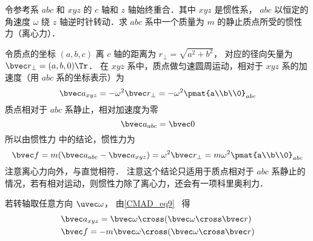 
令参考系 $abc$ 和 $xyz$ 的 $c$ 轴和 $z$ 轴始终重合．其中 $xyz$ 是惯性系， $abc$ 以恒定的角速度 $\omega$ 绕 $z$ 轴逆时针转动．求 $abc$ 系中一个质量为 $m$ 的静止质点所受的惯性力（离心力）．

令质点的坐标 $(a,b,c)$ 离 $c$ 轴的距离为 $r_\bot = \sqrt{a^2 + b^2}$， 对应的径向矢量为 $\bvec r_\bot = (a,b,0)\Tr$． 在 $xyz$ 系中，质点做匀速圆周运动，相对于 $xyz$ 系的加速度（用 $abc$ 系的坐标表示）为
\begin{equation}
\bvec a_{xyz} =  - \omega ^2 \bvec r_\bot =  - \omega ^2 \pmat{a\\b\\0}_{abc}
\end{equation}
质点相对于 $abc$ 系静止，相对加速度为零
\begin{equation}
\bvec a_{abc} = \bvec 0
\end{equation}
所以由惯性力 中的结论，惯性力为
\begin{equation}\label{Centri_eq3}
\bvec f = m(\bvec a_{abc} - \bvec a_{xyz}) = \omega^2\bvec r_\bot = m\omega ^2\pmat{a\\b\\0}_{abc}
\end{equation}
注意离心力向外，与直觉相符． 注意这个结论只适用于质点相对于 $abc$ 系静止的情况，若有相对运动，则惯性力除了离心力，还会有一项科里奥利力．

若转轴取任意方向 $\uvec\omega$， 由\autoref{CMAD_eq9}~ 得
\begin{align}
&\bvec a_{xyz} = \bvec\omega\cross (\bvec\omega\cross\bvec r)\\
&\bvec f = -m\bvec\omega\cross (\bvec\omega\cross\bvec r)\label{Centri_eq5}
\end{align}